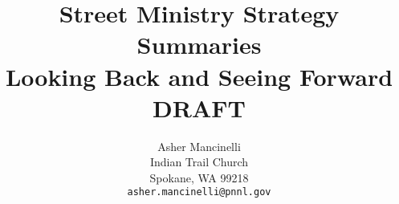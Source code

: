 \setlength{\parindent}{4em}
\setlength{\parskip}{1em}
\linespread{1}



\title{Street Ministry Strategy Summaries \\
    \large Looking Back and Seeing Forward \\
    \ifdefined\isedit
    \large DRAFT
    \fi}

\author{Asher Mancinelli \\
    Indian Trail Church \\
    Spokane, WA 99218 \\
    \texttt{asher.mancinelli@pnnl.gov} \\ }
